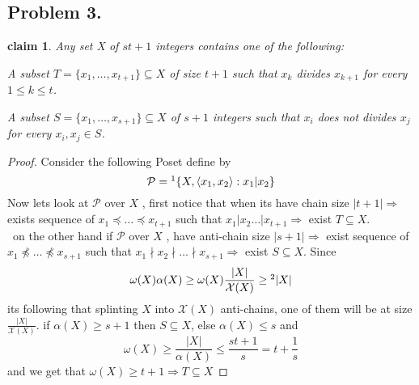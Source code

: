 \documentclass[12pt]{article}
\newtheorem*{claim*}{claim}
\begin{document}
\subsection*{Problem 3.}
\begin{claim*}
 Any set X of $st + 1$ integers contains one of the following:
 \begin{list}{•}{}
 \item  A subset $T = \{ x_1,\dots , x_{t+1}\} \subseteq X$ of size $t + 1$ such that $x_k$ divides $x_{k+1}$ for every $1 \le k \le t$.
 \item A subset $S = \{ x_1,\dots , x_{s+1}\} \subseteq X$ of  $s + 1$ integers such that $x_i$ does not divides $x_j$ for every $x_i,x_j\in S$.
 \end{list}
\end{claim*}
 \begin{proof}
 Consider the following Poset define by \[\mathcal{P}=\footnote{by inculding $\langle 0,0 \rangle$ as well}\{X,\langle x_1,x_2 \rangle :x_1|x_2\}
 \]
Now lets look at $\mathcal{P}$ over $X$ , first notice that when its have chain size $|t+1|\Rightarrow$ exists sequence of $ x_1\preceq \dots \preceq x_{t+1}$ such that $x_1 | x_2 \dots |x_{t+1}\Rightarrow$ exist  $T\subseteq X$.
\\\ on the other hand if  $\mathcal{P}$ over $X$ ,  have anti-chain size $|s+1|\Rightarrow$ exist sequence of $ x_1\npreceq \dots \npreceq x_{s+1}$ such that $x_1 \nmid x_2 \nmid \dots  \nmid x_{s+1}\Rightarrow$ exist  $S\subseteq X$.
Since \[\omega(X)\alpha(X)\geq \omega(X) \frac{|X|}{\mathcal{X}(X)} \geq\footnote{Mirsky} |X|
\]
its following that splinting $X$ into  $\mathcal{X}(X)$ anti-chains, one of them will be at size $ \frac{|X|}{\mathcal{X}(X)}$.
if $\alpha(X)\geq s+1$ then $S\subseteq X$, else $\alpha(X)\leq s$ and
\[
\omega (X)\geq \frac{|X|}{\alpha(X)}\le \frac{st+1}{s} = t+\frac{1}{s}
\]
and we get that $\omega (X) \geq t+1\Rightarrow T \subseteq X$
 \end{proof}
\end{document}
